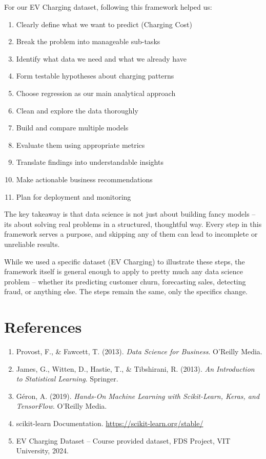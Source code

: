 \documentclass[12pt, a4paper]{article}
\begin{document}
For our EV Charging dataset, following this framework helped us:

\begin{enumerate}
    \item Clearly define what we want to predict (Charging Cost)
    \item Break the problem into manageable sub-tasks
    \item Identify what data we need and what we already have
    \item Form testable hypotheses about charging patterns
    \item Choose regression as our main analytical approach
    \item Clean and explore the data thoroughly
    \item Build and compare multiple models
    \item Evaluate them using appropriate metrics
    \item Translate findings into understandable insights
    \item Make actionable business recommendations
    \item Plan for deployment and monitoring
\end{enumerate}

The key takeaway is that data science is not just about building fancy models -- its about solving real problems in a structured, thoughtful way. Every step in this framework serves a purpose, and skipping any of them can lead to incomplete or unreliable results.

While we used a specific dataset (EV Charging) to illustrate these steps, the framework itself is general enough to apply to pretty much any data science problem -- whether its predicting customer churn, forecasting sales, detecting fraud, or anything else. The steps remain the same, only the specifics change.

\newpage

\section*{References}

\begin{enumerate}
    \item Provost, F., \& Fawcett, T. (2013). \textit{Data Science for Business}. O'Reilly Media.
    \item James, G., Witten, D., Hastie, T., \& Tibshirani, R. (2013). \textit{An Introduction to Statistical Learning}. Springer.
    \item Géron, A. (2019). \textit{Hands-On Machine Learning with Scikit-Learn, Keras, and TensorFlow}. O'Reilly Media.
    \item scikit-learn Documentation. \url{https://scikit-learn.org/stable/}
    \item EV Charging Dataset -- Course provided dataset, FDS Project, VIT University, 2024.
\end{enumerate}
\end{document}
